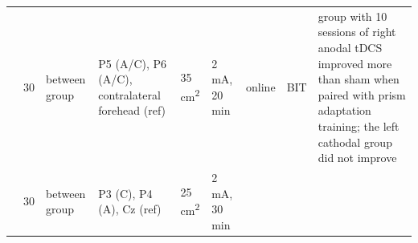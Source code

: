 \documentclass[11pt,]{memoir}
\begin{document}
\begin{longtable}[]{@{}lllllllll@{}}
\begin{minipage}[t]{0.09\columnwidth}
\end{minipage} & \begin{minipage}[t]{0.02\columnwidth}\raggedright
30\strut
\end{minipage} & \begin{minipage}[t]{0.04\columnwidth}\raggedright
between
group\strut
\end{minipage} & \begin{minipage}[t]{0.10\columnwidth}\raggedright
P5 (A/C), P6 (A/C),
contralateral
forehead (ref)\strut
\end{minipage} & \begin{minipage}[t]{0.04\columnwidth}\raggedright
35
cm\textsuperscript{2}\strut
\end{minipage} & \begin{minipage}[t]{0.04\columnwidth}\raggedright
2 mA,
20 min\strut
\end{minipage} & \begin{minipage}[t]{0.04\columnwidth}\raggedright
online\strut
\end{minipage} & \begin{minipage}[t]{0.10\columnwidth}\raggedright
BIT\strut
\end{minipage} & \begin{minipage}[t]{0.28\columnwidth}\raggedright
group with 10 sessions of right anodal tDCS improved more
than sham when paired with prism adaptation training; the
left cathodal group did not improve\strut
\end{minipage}\tabularnewline
\begin{minipage}[t]{0.09\columnwidth}\raggedright
\textcite{Yi2016}\strut
\end{minipage} & \begin{minipage}[t]{0.02\columnwidth}\raggedright
30\strut
\end{minipage} & \begin{minipage}[t]{0.04\columnwidth}\raggedright
between
group\strut
\end{minipage} & \begin{minipage}[t]{0.10\columnwidth}\raggedright
P3 (C), P4 (A), Cz
(ref)\strut
\end{minipage} & \begin{minipage}[t]{0.04\columnwidth}\raggedright
25
cm\textsuperscript{2}\strut
\end{minipage} & \begin{minipage}[t]{0.04\columnwidth}\raggedright
2 mA,
30 min\strut
\end{minipage} & \begin{minipage}[t]{0.04\columnwidth}\raggedright

\end{minipage}
\end{longtable}
\end{document}
